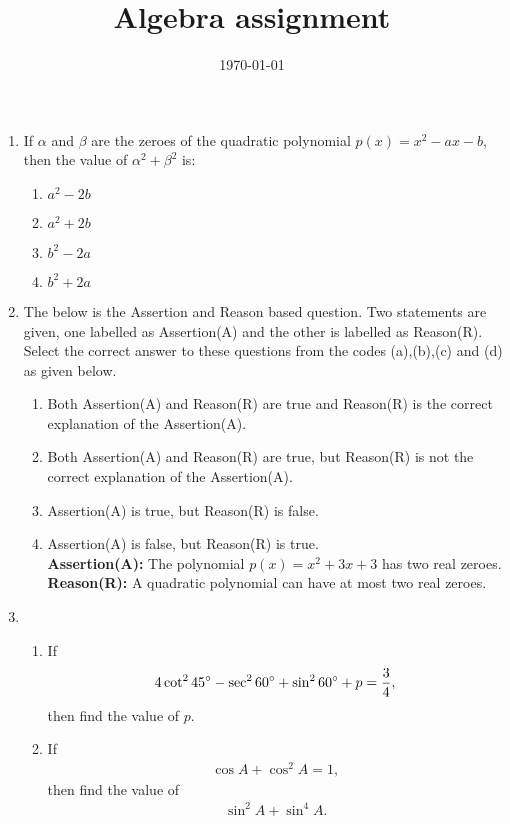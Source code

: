 \documentclass[12pt,-letter paper]{article}
\title{Algebra assignment}
\date{\today}
\begin{document}

\begin{enumerate}

\item If $\alpha$ and $\beta$ are the zeroes of the quadratic polynomial $p(x)=x^2-ax-b$, then the value of $\alpha^2 + \beta^2$ is:


\begin{enumerate}
\item $a^2-2b$
\item $a^2+2b$
\item $b^2-2a$
\item $b^2+2a$
\end{enumerate}

\item The below is the Assertion and Reason based question. Two statements are given, one labelled as Assertion(A) and the other is labelled as Reason(R). Select the correct answer to these questions from the codes (a),(b),(c) and (d) as given below.
\begin{enumerate}
\item Both Assertion(A) and Reason(R) are true and Reason(R) is the correct explanation of the Assertion(A).
\item Both Assertion(A) and Reason(R) are true, but Reason(R) is not the correct explanation of the Assertion(A).
\item Assertion(A) is true, but Reason(R) is false.
\item Assertion(A) is false, but Reason(R) is true.\\ 
\textbf{Assertion(A):} The polynomial $p(x)=x^2+3x+3$ has two real zeroes.\\
\textbf{Reason(R):} A quadratic polynomial can have at most two real zeroes.

\end{enumerate}

\item
\begin{enumerate}
\item If 
\begin{align}
    4\cot^2 45\degree - \sec^2 60\degree + \sin^2 60\degree + p = \frac{3}{4}, 
\end{align}
then find the value of $p$.
\item If 
\begin{align}
    \cos A+ \cos^2A=1,
\end{align}then find the value of 
\begin{align}
\sin^2A+\sin^4A.
\end{align}
\end{enumerate}



\end{enumerate}
\end{document}
